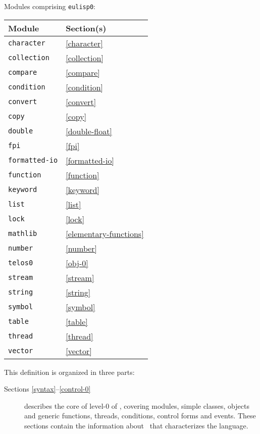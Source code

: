\begin{optDefinition}
Modules comprising {\tt eulisp0}:
\begin{center}
    \label{level-0-modules}
    \begin{tabular}{|ll|}\hline
        Module & Section(s)\\\hline
        {\tt character} & \ref{character}\\
        {\tt collection} & \ref{collection}\\
        {\tt compare} & \ref{compare}\\
        {\tt condition} & \ref{condition}\\
        {\tt convert} & \ref{convert}\\
        {\tt copy} & \ref{copy}\\
        {\tt double} & \ref{double-float}\\
        {\tt fpi} & \ref{fpi}\\
        {\tt formatted-io} & \ref{formatted-io}\\
        {\tt function} & \ref{function}\\
        {\tt keyword} & \ref{keyword}\\
        {\tt list} & \ref{list}\\
        {\tt lock} & \ref{lock}\\
        {\tt mathlib} & \ref{elementary-functions}\\
        {\tt number} & \ref{number}\\
        {\tt telos0} & \ref{obj-0}\\
        {\tt stream} & \ref{stream}\\
        {\tt string} & \ref{string}\\
        {\tt symbol} & \ref{symbol}\\
        {\tt table} & \ref{table}\\
        {\tt thread} & \ref{thread}\\
        {\tt vector} & \ref{vector}\\\hline
    \end{tabular}
\end{center}
%
\noindent
This definition is organized in three parts:
\begin{description}
    \item[Sections \ref{syntax}--\ref{control-0}] describes the core of level-0
    of \eulisp, covering modules, simple classes, objects and generic functions,
    threads, conditions, control forms and events.  These sections contain the
    information about \eulisp\ that characterizes the language.

\end{description}
\end{optDefinition}
